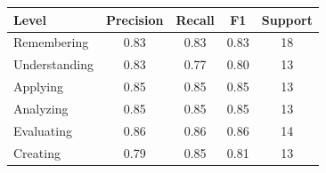 \begin{tabular}{lcccc}
\hline
Level & Precision & Recall & F1 & Support \\
\hline
Remembering & 0.83 & 0.83 & 0.83 & 18 \\
Understanding & 0.83 & 0.77 & 0.80 & 13 \\
Applying & 0.85 & 0.85 & 0.85 & 13 \\
Analyzing & 0.85 & 0.85 & 0.85 & 13 \\
Evaluating & 0.86 & 0.86 & 0.86 & 14 \\
Creating & 0.79 & 0.85 & 0.81 & 13 \\
\hline
\end{tabular}